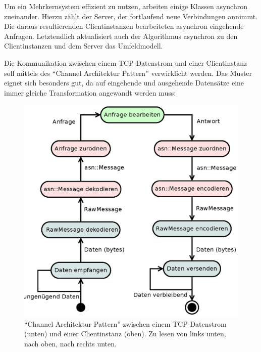 Um ein Mehrkernsystem effizient zu nutzen, arbeiten einige Klassen asynchron zueinander.
Hierzu zählt der Server, der fortlaufend neue Verbindungen annimmt.
Die daraus resultierenden Clientinstanzen bearbeiteten asynchron eingehende Anfragen.
Letztendlich aktualisiert auch der Algorithmus asynchron zu den Clientinstanzen und dem Server das Umfeldmodell.

Die Kommunikation zwischen einem TCP-Datenstrom und einer Clientinstanz soll mittels des \enquote{Channel Architektur Pattern} \cite[157]{douglass2003real} verwirklicht werden.
Das Muster eignet sich besonders gut, da auf eingehende und ausgehende Datensätze eine immer gleiche Transformation angewandt werden muss:

\begin{figure}[h]
	\centering
	\includegraphics[width=\textwidth]{dia/channel}
	\caption{\enquote{Channel Architektur Pattern} zwischen einem TCP-Datenstrom (unten) und einer Clientinstanz (oben). Zu lesen von links unten, nach oben, nach rechts unten.}
	\label{design:channel}
\end{figure}

